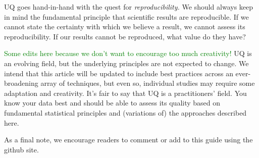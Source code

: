 UQ goes hand-in-hand with the quest for \emph{reproducibility.}  We should always keep in mind the fundamental principle that scientific results are reproducible.  If we cannot state the certainty with which we believe a result, we cannot assess its reproducibility.  If our results cannot be reproduced, what value do they have?

\textcolor{green}{Some edits here because we don't want to encourage too much creativity!}
UQ is an evolving field, but the underlying principles are not expected to change.
We intend that this article will be updated to include best practices across an ever-broadening array of techniques, but even so, individual studies may require some adaptation and creativity.
It's fair to say that UQ is a practitioners' field.  You know your data best and should be able to assess its quality based on fundamental statistical principles and (variations of) the approaches described here.

As a final note, we encourage readers to comment or add to this guide using the github site.
